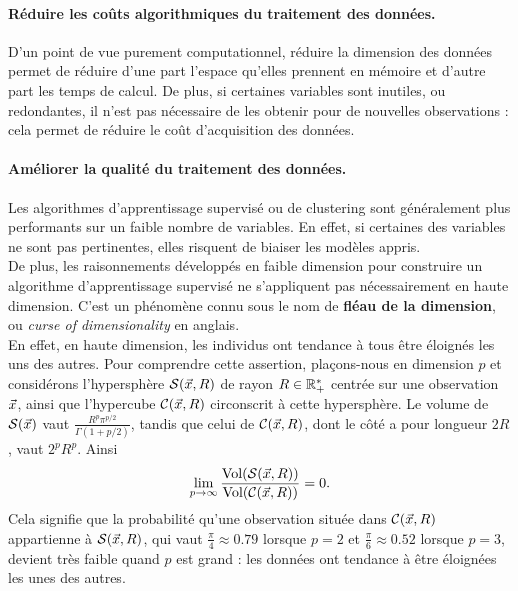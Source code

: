 \paragraph{Réduire les coûts algorithmiques du traitement des données.} D'un
point de vue purement computationnel, réduire la dimension des données permet
de réduire d'une part l'espace qu'elles prennent en mémoire et d'autre part les
temps de calcul. De plus, si certaines variables sont inutiles, ou redondantes,
il n'est pas nécessaire de les obtenir pour de nouvelles observations : cela
permet de réduire le coût d'acquisition des données.

\paragraph{Améliorer la qualité du traitement des données.} Les algorithmes
d'apprentissage supervisé ou de clustering sont généralement plus performants
sur un faible nombre de variables. En effet, si certaines des variables
ne sont pas pertinentes, elles risquent de biaiser les modèles appris.\\
De plus, les raisonnements développés en faible dimension pour construire un
algorithme d'apprentissage supervisé ne s'appliquent pas nécessairement en
haute dimension. C'est un phénomène connu sous le nom de \textbf{fléau de la
  dimension}, ou \textit{curse of dimensionality} en anglais. \\
En effet, en haute dimension, les individus ont tendance à tous être éloignés
les uns des autres. Pour comprendre cette assertion, plaçons-nous en dimension
$p$ et considérons l'hypersphère $\Scal(\xx, R)$ de rayon $R \in \mathbb{R}_+^*$
centrée sur une observation $\xx$, ainsi que l'hypercube $\Ccal(\xx, R)$
circonscrit à cette hypersphère. Le volume de $\Scal(\xx)$ vaut
$\frac{R^p \pi^{p/2}}{\Gamma(1+p/2)}$, tandis que celui de $\Ccal(\xx, R)$,
dont le côté a pour longueur $2R$, vaut $2^p R^p$. Ainsi
\begin{equation*}
  \lim_{p \rightarrow \infty} \frac{\text{Vol}(\Scal(\xx, R))}{
    \text{Vol}(\Ccal(\xx, R))} = 0.
\end{equation*}
Cela signifie que la probabilité qu'une observation située dans $\Ccal(\xx, R)$
appartienne à $\Scal(\xx, R)$, qui vaut $\frac{\pi}4 \approx 0.79$ lorsque
$p=2$ et $\frac{\pi}6 \approx 0.52$ lorsque $p=3$, devient très faible quand
$p$ est grand : les données ont tendance à être éloignées les unes des autres.


